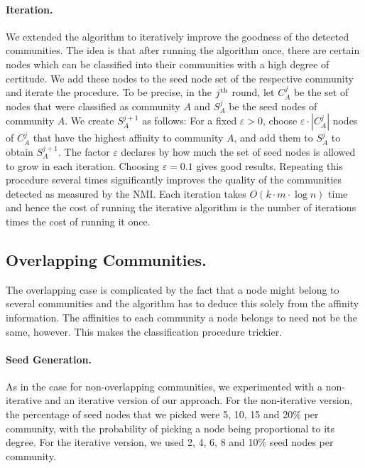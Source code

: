 \paragraph{Iteration.}
We extended the algorithm to iteratively improve the goodness of the detected communities.
The idea is that after running the algorithm once, there are certain nodes which can be classified 
into their communities with a high degree of certitude. We add these nodes to the seed node 
set of the respective community and iterate the procedure. To be precise, in the $j^{\textrm{th}}$ round, 
let $C^j_A$ be the set of nodes that were classified as community $A$ and $S^j_A$ 
be the seed nodes of community $A$. We create $S^{j+1}_A$ as follows: For a fixed $\varepsilon > 0$, 
choose $\varepsilon \cdot |C^j_A|$ nodes of $C^j_A$ that have the highest affinity to community $A$, 
and add them to $S^j_A$ to obtain $S^{j + 1}_A$. 
The factor $\varepsilon$ declares by how much the set of seed nodes is allowed to grow in each iteration. 
Choosing $\varepsilon = 0.1$ gives good results. Repeating this procedure several times significantly 
improves the quality of the communities detected as measured by the NMI. Each iteration takes 
$O(k \cdot m \cdot \log n)$ time and hence the cost of running the iterative algorithm is 
the number of iterations times the cost of running it once. 

\subsection{Overlapping Communities.}

The overlapping case is complicated by the fact that a node might belong to several 
communities and the algorithm has to deduce this solely from the affinity information. 
The affinities to each community a node belongs to need not be the same, however. This 
makes the classification procedure trickier. 

\paragraph{Seed Generation.}
As in the case for non-overlapping communities, we experimented with a non-iterative 
and an iterative version of our approach. For the non-iterative version, the percentage 
of seed nodes that we picked were 5, 10, 15 and 20$\%$ per community, with the probability
of picking a node being proportional to its degree. For the iterative version, we used 
2, 4, 6, 8 and 10$\%$ seed nodes per community. 

